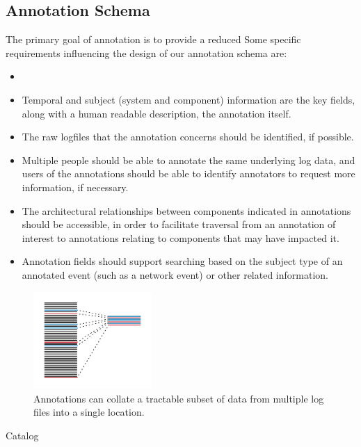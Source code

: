 \subsection{Annotation Schema}

The primary goal of annotation is to provide a reduced
Some specific requirements influencing the design of our annotation schema
are:

\begin{itemize}
\item 
\item Temporal and subject (system and component) information are 
      the key fields, along with a human readable description, the 
      annotation itself.
\item The raw logfiles that the annotation concerns should be identified,
      if possible.
\item Multiple people should be able to annotate the same underlying 
      log data, and users of the annotations should be able to 
      identify annotators to request more information, if necessary.  
\item The architectural relationships between components indicated in 
      annotations should be accessible, in order to facilitate 
      traversal from an annotation of interest to annotations relating to
      components that may have impacted it.
\item Annotation fields should support searching based on the subject type 
      of an annotated event (such as a network event) or other 
      related information.
\end{itemize}



\begin{figure}
\includegraphics[width=0.4\textwidth]{annotations.png}
\caption{Annotations can collate a tractable subset of data from multiple log files into a single location.  }
\label{f:annotations}
\end{figure}

\begin{description}
\item[Catalog] \hfill

\end{description}

